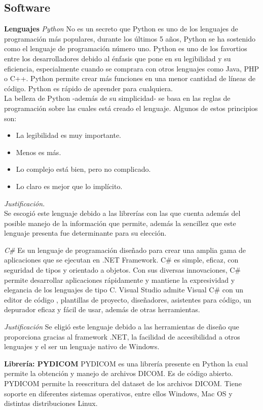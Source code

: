 \documentclass[12pt]{report}
\begin{document}
\subsection{Software}
\textbf{Lenguajes}
\textit{Python}
No es un secreto que Python es uno de los lenguajes de programación más populares, durante los últimos 5 años, Python se ha sostenido como el lenguaje de programación número uno. Python es uno de los favortios entre los desarrolladores debido al énfasis que pone en su legibilidad y su eficiencia, especialmente cuando se comprara con otros lenguajes como Java, PHP o C++. Python permite crear más funciones en una menor cantidad de líneas de código. Python es rápido de aprender para cualquiera.\\
La belleza de Python -además de su simplicidad- se basa en las reglas de programación sobre las cuales está creado el lenguaje. Algunos de estos principios son:
\begin{itemize}
\item La legibilidad es muy importante.
\item Menos es más.
\item Lo complejo está bien, pero no complicado.
\item Lo claro es mejor que lo implícito.
\end{itemize}

\textit{Justificación.}\\ Se escogió este lenguaje debido a las librerías con las que cuenta además del posible manejo de la información que permite, además la sencillez que este lenguaje presenta fue determinante para su elección.

\textit{C\#}
Es un lenguaje de programación diseñado para crear una amplia gama de aplicaciones que se ejecutan en .NET Framework. C\# es simple, eficaz, con seguridad de tipos y orientado a objetos. Con sus diversas innovaciones, C\# permite desarrollar aplicaciones rápidamente y mantiene la expresividad y elegancia de los lenguajes de tipo C. Visual Studio admite Visual C\# con un editor de código , plantillas de proyecto, diseñadores, asistentes para código, un depurador eficaz y fácil de usar, además de otras herramientas.

\textit{Justificación}
Se eligió este lenguaje debido a las herramientas de diseño que proporciona gracias al framework .NET, la facilidad de accesibilidad a otros lenguajes y el ser un lenguaje nativo de Windows.


\textbf{Librería: PYDICOM}
PYDICOM es una librería presente en Python la cual permite la obtención y manejo de archivos DICOM. Es de código abierto. PYDICOM permite la reescritura del dataset de los archivos DICOM. Tiene soporte en diferentes sistemas operativos, entre ellos Windows, Mac OS y distintas distribuciones Linux.
\end{document}
